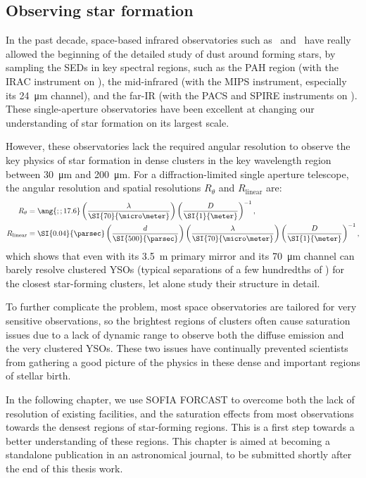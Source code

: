 \subsection{Observing star formation}

In the past decade, space-based infrared observatories such as \Spitzer\ and \Herschel\ have really allowed the beginning of the detailed study of dust around forming stars, by sampling the SEDs in key spectral regions, such as the PAH region (with the IRAC instrument on \Spitzer), the mid-infrared (with the MIPS instrument, especially its \SI{24}{\micro\meter} channel), and the far-IR (with the PACS and SPIRE instruments on \Herschel). These single-aperture observatories have been excellent at changing our understanding of star formation on its largest scale.

However, these observatories lack the required angular resolution to observe the key physics of star formation in dense clusters in the key wavelength region between \SI{30}{\micro\meter} and \SI{200}{\micro\meter}. For a diffraction-limited single aperture telescope, the angular resolution and spatial resolutions $R_\theta$ and $R_\textrm{linear}$ are:
\begin{align}
R_\theta &= \ang{;;17.6}\left(\frac{\lambda}{\SI{70}{\micro\meter}}\right)\left(\frac{D}{\SI{1}{\meter}}\right)^{-1}, \\
R_\textrm{linear} &= \SI{0.04}{\parsec}\left(\frac{d}{\SI{500}{\parsec}}\right)\left(\frac{\lambda}{\SI{70}{\micro\meter}}\right)\left(\frac{D}{\SI{1}{\meter}}\right)^{-1},
\end{align}
which shows that even \Herschel with its \SI{3.5}{\meter} primary mirror and its \SI{70}{\micro\meter} channel can barely resolve clustered YSOs (typical separations of a few hundredths of \si{\parsec}) for the closest star-forming clusters, let alone study their structure in detail. 

To further complicate the problem, most space observatories are tailored for very sensitive observations, so the brightest regions of clusters often cause saturation issues due to a lack of dynamic range to observe both the diffuse emission and the very clustered YSOs. These two issues have continually prevented scientists from gathering a good picture of the physics in these dense and important regions of stellar birth.

In the following chapter, we use SOFIA FORCAST to overcome both the lack of resolution of existing facilities, and the saturation effects from most observations towards the densest regions of star-forming regions. This is a first step towards a better understanding of these regions. This chapter is aimed at becoming a standalone publication in an astronomical journal, to be submitted shortly after the end of this thesis work.

